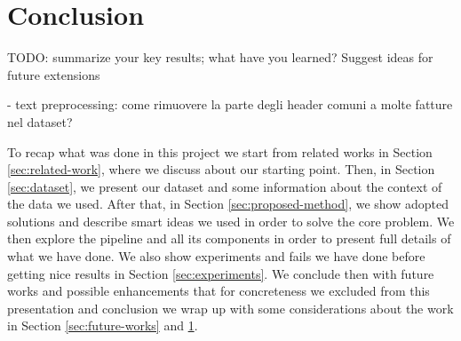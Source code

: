 \documentclass[10pt,twocolumn,letterpaper]{article}
\begin{document}
\section{Conclusion}
\label{sec:conclusion}

TODO: summarize your key results; what have you
learned? Suggest ideas for future extensions

- text preprocessing: come rimuovere la parte degli header comuni a molte fatture nel dataset?

To recap what was done in this project we start from related works in Section
\ref{sec:related-work}, where we discuss about our starting
point. Then, in Section \ref{sec:dataset}, we present our dataset and
some information about the context of the data we used. After that, in
Section \ref{sec:proposed-method}, we show adopted solutions and
describe smart ideas we used in order to solve the core problem. We
then explore the pipeline and all its components in order to present
full details of what we have done. We also show experiments and fails
we have done before getting nice results in Section
\ref{sec:experiments}. We conclude then with future works and possible
enhancements that for concreteness we excluded from this presentation
and conclusion we wrap up with some considerations about the work in
Section \ref{sec:future-works} and \ref{sec:conclusion}.

{\small


}
\end{document}
